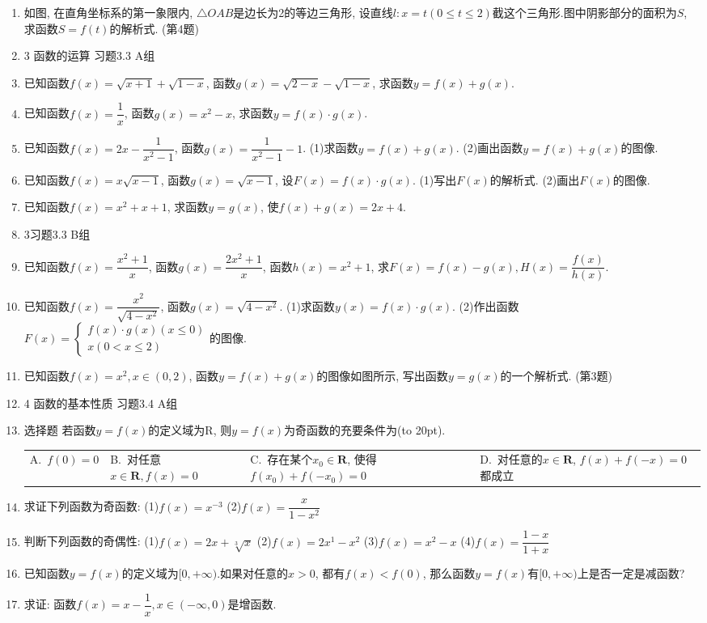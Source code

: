 \documentclass[10pt,a4paper]{article}
\newcommand{\bracket}[1]{(\hbox to #1pt{})}
\newcommand{\fourch}[4]{\par\begin{tabular}{p{.23\textwidth}p{.23\textwidth}p{.23\textwidth}p{.23\textwidth}}
A.~#1 &B.~#2& C.~#3& D.~#4
\end{tabular}}
\begin{document}
\begin{enumerate}[1.]
\item 如图, 在直角坐标系的第一象限内, $\triangle OAB$是边长为2的等边三角形, 设直线$l:x=t(0\le t\le 2)$截这个三角形.图中阴影部分的面积为$S$, 求函数$S=f(t)$的解析式.
(第4题)
\item 3  函数的运算
习题3.3  A组
\item 已知函数$f(x)=\sqrt {x+1}+\sqrt {1-x}$, 函数$g(x)=\sqrt {2-x}-\sqrt {1-x}$, 求函数$y=f(x)+g(x)$.
\item 已知函数$f(x)=\dfrac 1x$, 函数$g(x)=x^2-x$, 求函数$y=f(x)\cdot g(x)$.
\item 已知函数$f(x)=2x-\dfrac 1{x^2-1}$, 函数$g(x)=\dfrac 1{x^2-1}-1$.
(1)求函数$y=f(x)+g(x)$.
(2)画出函数$y=f(x)+g(x)$的图像.
\item 已知函数$f(x)=x\sqrt {x-1}$, 函数$g(x)=\sqrt {x-1}$, 设$F(x)=f(x)\cdot g(x)$.
(1)写出$F(x)$的解析式.
(2)画出$F(x)$的图像.
\item 已知函数$f(x)=x^2+x+1$, 求函数$y=g(x)$, 使$f(x)+g(x)=2x+4$.
\item 3习题3.3  B组
\item 已知函数$f(x)=\dfrac{x^2+1}x$, 函数$g(x)=\dfrac{2x^2+1}x$, 函数$h(x)=x^2+1$, 求$F(x)=f(x)-g(x),H(x)=\dfrac{f(x)}{h(x)}$.
\item 已知函数$f(x)=\dfrac{x^2}{\sqrt {4-{x^2}}}$, 函数$g(x)=\sqrt {4-x^2}$.
(1)求函数$y(x)=f(x)\cdot g(x)$.
(2)作出函数$F(x)=\begin{cases} f(x)\cdot g(x)(x\le 0) \\ x(0<x\le 2) \end{cases}$的图像.
\item 已知函数$f(x)=x^2,x\in (0,2)$, 函数$y=f(x)+g(x)$的图像如图所示, 写出函数$y=g(x)$的一个解析式.
(第3题)
\item 4  函数的基本性质
习题3.4  A组
\item 选择题
若函数$y=f(x)$的定义域为R, 则$y=f(x)$为奇函数的充要条件为\bracket{20}.
\fourch{$f(0)=0$}{对任意$x\in \mathbf{R},f(x)=0$}{存在某个$x_0\in \mathbf{R}$, 使得$f(x_0)+f(-x_0)=0$}{对任意的$x\in \mathbf{R}$, $f(x)+f(-x)=0$都成立}
\item 求证下列函数为奇函数:
(1)$f(x)=x^{-3}$								(2)$f(x)=\dfrac x{1-x^2}$
\item 判断下列函数的奇偶性:
(1)$f(x)=2x+\sqrt[3]x$						(2)$f(x)=2x^1-x^2$
(3)$f(x)=x^2-x$							(4)$f(x)=\dfrac{1-x}{1+x}$
\item 已知函数$y=f(x)$的定义域为$[0,+\infty)$.如果对任意的$x>0$, 都有$f(x)<f(0)$, 那么函数$y=f(x)$有$[0,+\infty)$上是否一定是减函数?
\item 求证: 函数$f(x)=x-\dfrac 1x,x\in (-\infty ,0)$是增函数.

\end{enumerate}
\end{document}
